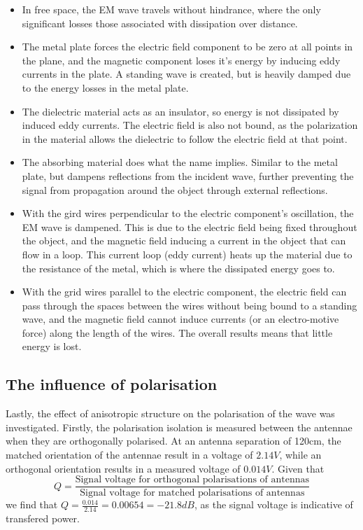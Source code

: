 \documentclass[11pt,a4paper]{article}
\begin{document}
\begin{itemize}
\item In free space, the EM wave travels without hindrance, where the only significant losses those associated with dissipation over distance.
\item The metal plate forces the electric field component to be zero at all points in the plane, and the magnetic component loses it's energy by inducing eddy currents in the plate. A standing wave is created, but is heavily damped due to the energy losses in the metal plate.
\item The dielectric material acts as an insulator, so energy is not dissipated by induced eddy currents. The electric field is also not bound, as the polarization in the material allows the dielectric to follow the electric field at that point. 
\item The absorbing material does what the name implies. Similar to the metal plate, but dampens reflections from the incident wave, further preventing the signal from propagation around the object through external reflections.
\item With the gird wires perpendicular to the electric component's oscillation, the EM wave is dampened. This is due to the electric field being fixed throughout the object, and the magnetic field inducing a current in the object that can flow in a loop. This current loop (eddy current) heats up the material due to the resistance of the metal, which is where the dissipated energy goes to.
\item With the grid wires parallel to the electric component, the electric field can pass through the spaces between the wires without being bound to a standing wave, and the magnetic field cannot induce currents (or an electro-motive force) along the length of the wires. The overall results means that little energy is lost.
\end{itemize}

\subsection{The influence of polarisation}
Lastly, the effect of anisotropic structure on the polarisation of the wave was investigated. Firstly, the polarisation isolation is measured between the antennae when they are orthogonally polarised. At an antenna separation of 120cm, the matched orientation of the antennae result in a voltage of $2.14V$, while an orthogonal orientation results in a measured voltage of $0.014V$. Given that 
\[Q = \frac{\text{Signal voltage for orthogonal polarisations of antennas}}{\text{Signal voltage for matched polarisations of antennas}}\] we find that $Q = \frac{0.014}{2.14} = 0.00654 = -21.8 dB$, as the signal voltage is indicative of transfered power.\\
\end{document}
